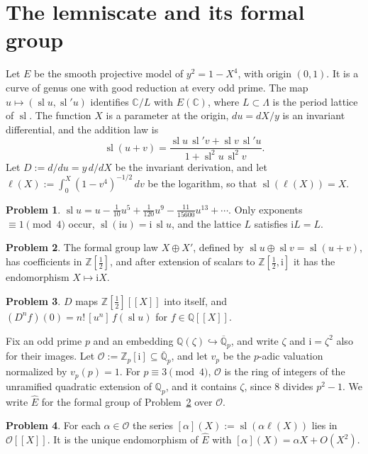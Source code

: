 \documentclass[reqno]{amsart}
\theoremstyle{definition}
\newtheorem{problem}{Problem}[section]
\theoremstyle{plain}
\newcommand{\Z}{\mathbb{Z}}
\newcommand{\Q}{\mathbb{Q}}
\newcommand{\C}{\mathbb{C}}
\newcommand{\ii}{\mathrm{i}}
\newcommand{\Oc}{\mathcal{O}}
\newcommand{\sll}{\operatorname{sl}}
\begin{document}
\section{The lemniscate and its formal group}\label{sec:lemniscate}

Let \(E\) be the smooth projective model of \(y^2 = 1 - X^4\), with origin \((0,1)\).  It is a curve of genus one with good reduction at every odd prime.  The map \(u \mapsto (\sll u, \sll' u)\) identifies \(\C/L\) with \(E(\C)\), where \(L \subset \Lambda\) is the period lattice of \(\sll\).  The function \(X\) is a parameter at the origin, \(du = dX/y\) is an invariant differential, and the addition law is
\[
  \sll(u + v) = \frac{\sll u\, \sll' v + \sll v\, \sll' u}{1 + \sll^2 u\, \sll^2 v} .
\]
Let \(D := d/du = y \, d/dX\) be the invariant derivation, and let \(\ell(X) := \int_0^X (1 - v^4)^{-1/2} \, dv\) be the logarithm, so that \(\sll(\ell(X)) = X\).

\begin{problem}\label{pr:sl-series}
\(\sll u = u - \tfrac1{10}u^5 + \tfrac1{120}u^9 - \tfrac{11}{15600}u^{13} + \dotsb\).  Only exponents \(\equiv 1 \pmod 4\) occur, \(\sll(\ii u) = \ii\, \sll u\), and the lattice \(L\) satisfies \(\ii L = L\).
\end{problem}

\begin{problem}\label{pr:fg}
The formal group law \(X \oplus X'\), defined by \(\sll u \oplus \sll v = \sll(u + v)\), has coefficients in \(\Z[\tfrac12]\), and after extension of scalars to \(\Z[\tfrac12,\ii]\) it has the endomorphism \(X \mapsto \ii X\).
\end{problem}

\begin{problem}\label{pr:D}
\(D\) maps \(\Z[\tfrac12][[X]]\) into itself, and \((D^n f)(0) = n!\, [u^n]\, f(\sll u)\) for \(f \in \Q[[X]]\).
\end{problem}

Fix an odd prime \(p\) and an embedding \(\Q(\zeta) \hookrightarrow \overline{\Q}_p\), and write \(\zeta\) and \(\ii = \zeta^2\) also for their images.  Let \(\Oc := \Z_p[\ii] \subseteq \overline{\Q}_p\), and let \(v_p\) be the \(p\)-adic valuation normalized by \(v_p(p) = 1\).  For \(p \equiv 3 \pmod 4\), \(\Oc\) is the ring of integers of the unramified quadratic extension of \(\Q_p\), and it contains \(\zeta\), since \(8\) divides \(p^2 - 1\).  We write \(\hat E\) for the formal group of Problem~\ref{pr:fg} over \(\Oc\).

\begin{problem}\label{pr:O-action}
For each \(\alpha \in \Oc\) the series \([\alpha](X) := \sll(\alpha \ell(X))\) lies in \(\Oc[[X]]\).  It is the unique endomorphism of \(\hat E\) with \([\alpha](X) = \alpha X + O(X^2)\).
\end{problem}
\end{document}

